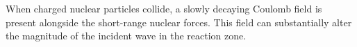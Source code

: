 When charged nuclear particles collide, a slowly decaying Coulomb field is present alongside the short-range nuclear forces. This field can substantially alter the magnitude of the incident wave in the reaction zone.
